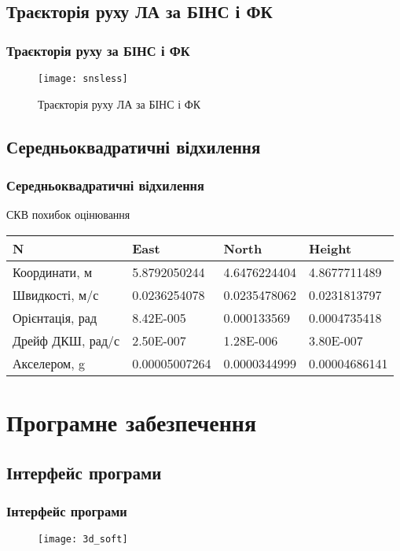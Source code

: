 \documentclass[ucs,compress]{beamer}    %
\begin{document}
\subsection{Траєкторія руху ЛА за БІНС і ФК} 
\begin{frame}%
\frametitle{Траєкторія руху за БІНС і ФК}
\noindent
\begin{figure}[l]
\texttt{[image: snsless]}
\caption{\tiny Траєкторія руху ЛА за БІНС і ФК }
\end{figure}

\end{frame}
\subsection{Середньоквадратичні відхилення}
\begin{frame}
\frametitle{Середньоквадратичні відхилення}
\begin{block}{СКВ похибок оцінювання}
\begin{table}%
\centering
\small
\begin{tabular}{|p{30mm}|p{20mm}|p{20mm}|p{20mm}|} \hline
N&East&North&Height \\ \hline
Координати, м & 5.8792050244& 4.6476224404& 4.8677711489 \\ \hline 
Швидкості, м/с& 0.0236254078& 0.0235478062& 0.0231813797 \\ \hline 
Орієнтація, рад& 8.42E-005& 0.000133569& 0.0004735418 \\ \hline 
Дрейф ДКШ, рад/с& 2.50E-007& 1.28E-006 & 3.80E-007 \\ \hline 
Акселером, g & 0.00005007264& 0.0000344999 & 0.00004686141 \\ \hline 
\end{tabular}
\label{tab:results}
\end{table}
\end{block}
\end{frame}


\section{Програмне забезпечення} 
\subsection{Інтерфейс програми} 
\begin{frame}%
\frametitle{Інтерфейс програми}
\begin{figure}
\centering
\texttt{[image: 3d\_soft]}
\end{figure}
\end{frame}
\end{document}
